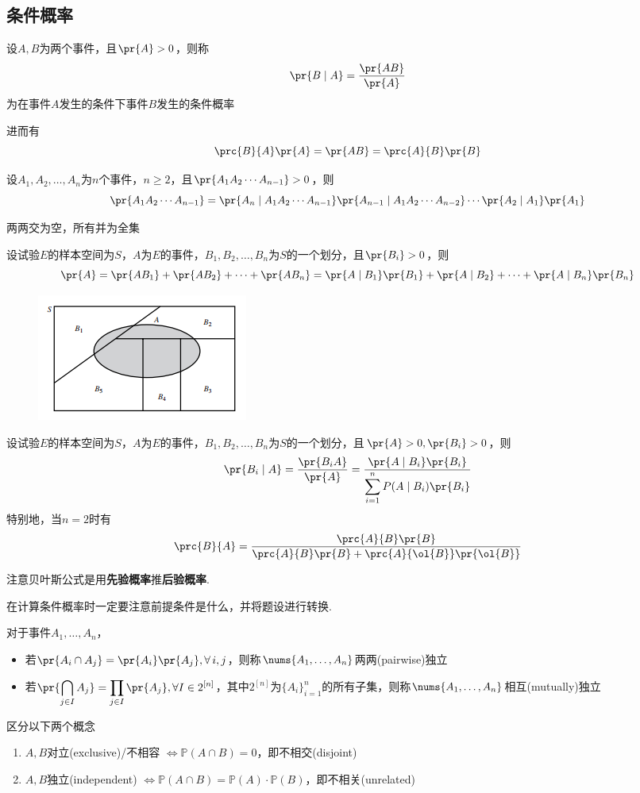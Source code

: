 \subsection{条件概率}
\begin{definition}[条件概率]
设$A,B$为两个事件，且$\pr{A}>0$，则称
\[\pr{B\mid A}=\dfrac{\pr{AB}}{\pr{A}}\]
为在事件$A$发生的条件下事件$B$发生的条件概率
\end{definition}
进而有
\[\prc{B}{A}\pr{A}=\pr{AB}=\prc{A}{B}\pr{B}\]
\begin{theorem}[乘法公式]
设$A_1,A_2,\ldots,A_n$为$n$个事件，$n\geq 2$，且$\pr{A_1A_2\cdots A_{n-1}}>0$，则
\[\pr{A_1A_2\cdots A_{n-1}}=\pr{A_n\mid A_1A_2\cdots A_{n-1}}\pr{A_{n-1}\mid A_1A_2\cdots A_{n-2}}\cdots\pr{A_2\mid A_1}\pr{A_1}\]
\end{theorem}
\begin{definition}[划分]
两两交为空，所有并为全集
\end{definition}
\begin{theorem}[全概率公式]
设试验$E$的样本空间为$S$，$A$为$E$的事件，$B_1,B_2,\ldots,B_n$为$S$的一个划分，且$\pr{B_i}>0$，则
\[\pr{A}=\pr{AB_1}+\pr{AB_2}+\cdots+\pr{AB_n}=\pr{A\mid B_1}\pr{B_1}+\pr{A\mid B_2}+\cdots+\pr{A\mid B_n}\pr{B_n}\]
\end{theorem}
\begin{figure}[H]
\centering
\includegraphics[width=0.35\linewidth]{fig/total_probability.PNG}
\end{figure}
\begin{theorem}
设试验$E$的样本空间为$S$，$A$为$E$的事件，$B_1,B_2,\ldots,B_n$为$S$的一个划分，且$\pr{A}>0,\pr{B_i}>0$，则
\[\pr{B_i\mid A}=\frac{\pr{B_iA}}{\pr{A}}=\frac{\pr{A\mid B_i}\pr{B_i}}{\displaystyle\sum_{i=1}^nP(A\mid B_i)\pr{B_i}}\]
特别地，当$n=2$时有
\[\prc{B}{A}=\dfrac{\prc{A}{B}\pr{B}}{\prc{A}{B}\pr{B}+\prc{A}{\ol{B}}\pr{\ol{B}}}\]
\end{theorem}
\par 注意贝叶斯公式是用\textbf{先验概率}推\textbf{后验概率}.
\par 在计算条件概率时一定要注意前提条件是什么，并将题设进行转换.
\begin{definition}[独立性]
\rm 对于事件$A_1,\ldots,A_n$，
\begin{itemize}
	\item 若$\pr{A_i\cap A_j}=\pr{A_i}\pr{A_j},\forall\,i,j$，则称$\nums{A_1,\ldots,A_n}$两两(pairwise)独立
	\item 若$\displaystyle\pr{\bigcap_{j\in I}A_j}=\prod_{j\in I}\pr{A_j},\forall I\in 2^{[n]}$，其中$2^{[n]}$为$\{A_i\}_{i=1}^n$的所有子集，则称$\nums{A_1,\ldots,A_n}$相互(mutually)独立
\end{itemize}
\end{definition}
\par 区分以下两个概念
\begin{enumerate}
	\item $A,B$对立(exclusive)/不相容 $\Leftrightarrow \mathbb{P}(A\cap B)=0$，即不相交(disjoint)
	\item $A,B$独立(independent) $\Leftrightarrow \mathbb{P}(A\cap B)=\mathbb{P}(A)\cdot\mathbb{P}(B)$，即不相关(unrelated)
\end{enumerate}